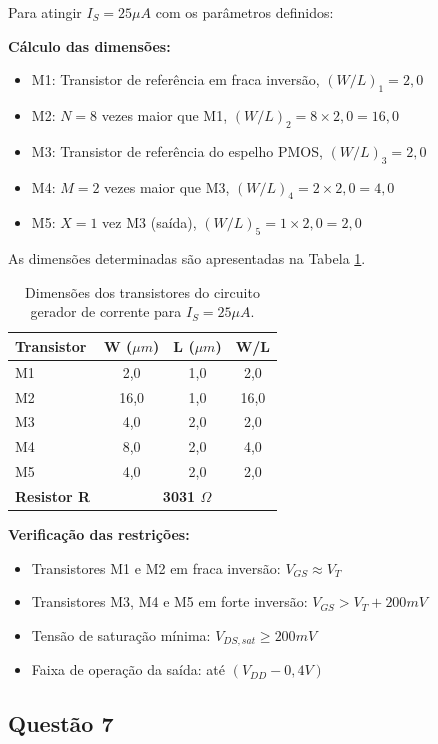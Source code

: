 \documentclass[12pt,a4paper]{article}
\begin{document}
Para atingir $I_S = 25 \mu A$ com os parâmetros definidos:

\textbf{Cálculo das dimensões:}
\begin{itemize}
    \item M1: Transistor de referência em fraca inversão, $(W/L)_1 = 2,0$
    \item M2: $N = 8$ vezes maior que M1, $(W/L)_2 = 8 \times 2,0 = 16,0$
    \item M3: Transistor de referência do espelho PMOS, $(W/L)_3 = 2,0$
    \item M4: $M = 2$ vezes maior que M3, $(W/L)_4 = 2 \times 2,0 = 4,0$
    \item M5: $X = 1$ vez M3 (saída), $(W/L)_5 = 1 \times 2,0 = 2,0$
\end{itemize}

As dimensões determinadas são apresentadas na Tabela \ref{tab:dimensoes}.

\begin{table}[H]
\centering
\caption{Dimensões dos transistores do circuito gerador de corrente para $I_S = 25\mu A$.}
\label{tab:dimensoes}
\begin{tabular}{@{}lccc@{}}
\toprule
\textbf{Transistor} & \textbf{W ($\mu m$)} & \textbf{L ($\mu m$)} & \textbf{W/L} \\ \midrule
M1 & 2,0 & 1,0 & 2,0 \\
M2 & 16,0 & 1,0 & 16,0 \\
M3 & 4,0 & 2,0 & 2,0 \\
M4 & 8,0 & 2,0 & 4,0 \\
M5 & 4,0 & 2,0 & 2,0 \\
\textbf{Resistor R} & \multicolumn{3}{c}{\textbf{3031 $\Omega$}} \\ \bottomrule
\end{tabular}
\end{table}

\textbf{Verificação das restrições:}
\begin{itemize}
    \item Transistores M1 e M2 em fraca inversão: $V_{GS} \approx V_T$
    \item Transistores M3, M4 e M5 em forte inversão: $V_{GS} > V_T + 200mV$
    \item Tensão de saturação mínima: $V_{DS,sat} \geq 200mV$
    \item Faixa de operação da saída: até $(V_{DD} - 0,4V)$
\end{itemize}

\subsection*{Questão 7}
\end{document}
